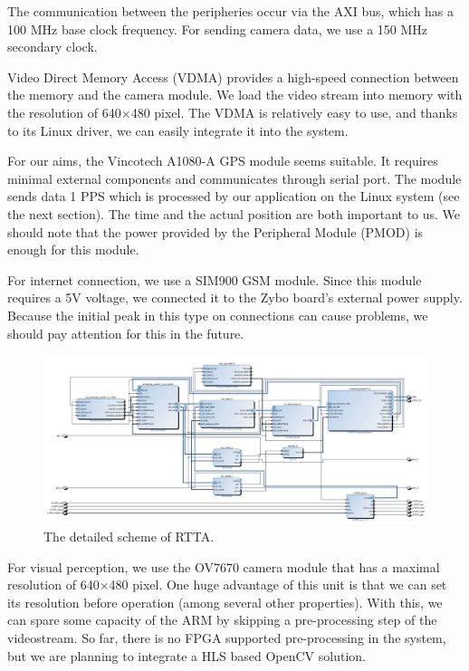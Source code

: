 \documentclass[b5paper,12pt]{report}
\theoremstyle{definition}
\begin{document}
The communication between the peripheries occur via the AXI bus, which has a 100 MHz base clock frequency. For sending camera data, we use a 150 MHz secondary clock.

Video Direct Memory Access (VDMA) provides a high-speed connection between the memory and the camera module. We load the video stream into memory with the resolution of 640$\times$480 pixel. The VDMA is relatively easy to use, and thanks to its Linux driver, we can easily integrate it into the system.

For our aims, the Vincotech A1080-A GPS module seems suitable. It requires minimal external components and communicates through serial port. The module sends data 1 PPS which is processed by our application on the Linux system (see the next section). The time and the actual position are both important to us. We should note that the power provided by the Peripheral Module (PMOD) is enough for this module.

For internet connection, we use a SIM900 GSM module. Since this module requires a 5V voltage, we connected it to the Zybo board's external power supply. Because the initial peak in this type on connections can cause problems, we should pay attention for this in the future.

\begin{figure}
    \centering
    \includegraphics[width=17cm]{img/base_design_1.jpg}
    \caption{The detailed scheme of RTTA.}
    \label{detailedscheme}
\end{figure}

For visual perception, we use the OV7670 camera module that has a maximal resolution of 640$\times$480 pixel. One huge advantage of this unit is that we can set its resolution before operation (among several other properties). With this, we can spare some capacity of the ARM by skipping a pre-processing step of the videostream. So far, there is no FPGA supported pre-processing in the system, but we are planning to integrate a HLS based OpenCV solution.
\end{document}
